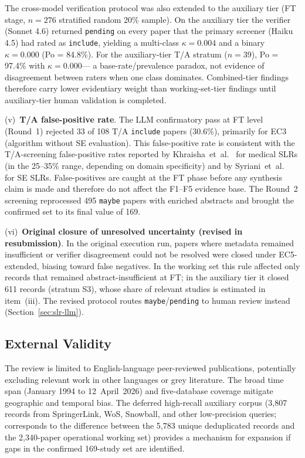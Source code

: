 

The cross-model verification protocol was also extended to the auxiliary
tier (FT stage, $n = 276$ stratified
random 20\% sample). On the auxiliary tier the verifier (Sonnet 4.6)
returned \texttt{pending} on every paper that the primary screener
(Haiku 4.5) had rated as \texttt{include}, yielding a multi-class
$\kappa = 0.004$ and a binary $\kappa = 0.000$ (Po = 84.8\%). For the
auxiliary-tier T/A stratum ($n=39$), Po = 97.4\% with $\kappa = 0.000$---
a base-rate/prevalence paradox, not evidence of disagreement between raters
when one class dominates. Combined-tier findings therefore carry lower
evidentiary weight than working-set-tier findings until auxiliary-tier human
validation is completed.



(v)~\textbf{T/A false-positive rate}.
The LLM confirmatory pass at FT level (Round~1) rejected 33 of 108 T/A
\texttt{include} papers (30.6\%), primarily for EC3 (algorithm without SE
evaluation). This false-positive rate is consistent with the
T/A-screening false-positive rates reported by Khraisha~et~al.\
\cite{khraisha2024} for medical SLRs (in the 25--35\% range, depending on
domain specificity) and by Syriani~et~al.~\cite{syriani2023} for SE
SLRs. False-positives are caught at the FT phase before any synthesis claim
is made and therefore do not affect the F1--F5 evidence base. The Round~2
screening reprocessed 495 \texttt{maybe} papers with enriched abstracts and
brought the confirmed set to its final value of 169.

(vi)~\textbf{Original closure of unresolved uncertainty (revised in resubmission)}.
In the original execution run, papers where metadata remained insufficient or
verifier disagreement could not be resolved were closed under EC5-extended,
biasing toward false negatives. In the working set this rule affected only
records that remained abstract-insufficient at FT; in the auxiliary tier it
closed 611 records (stratum S3), whose share of relevant studies is
estimated in item~(iii). The revised protocol routes
\texttt{maybe}/\texttt{pending} to human review instead
(Section~\ref{sec:slr-llm}).

\subsection{External Validity}

The review is limited to English-language peer-reviewed publications,
potentially excluding relevant work in other languages or grey literature.
The broad time span (January 1994 to 12~April~2026) and five-database coverage mitigate
geographic and temporal bias. The deferred high-recall auxiliary corpus
(3{,}807 records from SpringerLink, WoS, Snowball, and other low-precision
queries; corresponds to the difference between the 5{,}783 unique deduplicated
records and the 2{,}340-paper operational working set) provides a mechanism
for expansion if gaps in the confirmed 169-study set are identified.

